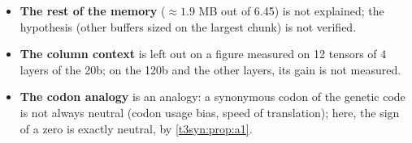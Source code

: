 \begin{faux}
\begin{itemize}
\item \textbf{The rest of the memory} ($\approx 1.9$ MB out of 6.45) is not explained; the hypothesis (other buffers sized on the largest chunk) is not verified.
\item \textbf{The column context} is left out on a figure measured on 12 tensors of 4 layers of the 20b; on the 120b and the other layers, its gain is not measured.
\item \textbf{The codon analogy} is an analogy: a synonymous codon of the genetic code is not always neutral (codon usage bias, speed of translation); here, the sign of a zero is exactly neutral, by \cref{t3syn:prop:a1}.
\end{itemize}
\end{faux}
